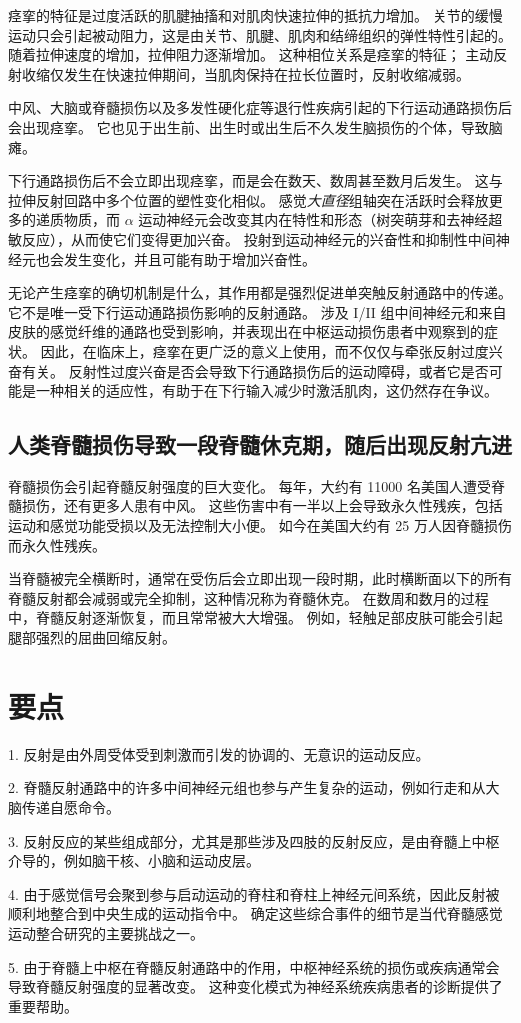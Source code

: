 痉挛的特征是过度活跃的肌腱抽搐和对肌肉快速拉伸的抵抗力增加。
关节的缓慢运动只会引起被动阻力，这是由关节、肌腱、肌肉和结缔组织的弹性特性引起的。
随着拉伸速度的增加，拉伸阻力逐渐增加。
这种相位关系是痉挛的特征；
主动反射收缩仅发生在快速拉伸期间，当肌肉保持在拉长位置时，反射收缩减弱。


中风、大脑或脊髓损伤以及多发性硬化症等退行性疾病引起的下行运动通路损伤后会出现痉挛。
它也见于出生前、出生时或出生后不久发生脑损伤的个体，导致脑瘫。


下行通路损伤后不会立即出现痉挛，而是会在数天、数周甚至数月后发生。
这与拉伸反射回路中多个位置的塑性变化相似。
感觉\textit{大直径}组轴突在活跃时会释放更多的递质物质，而 $ \alpha $ 运动神经元会改变其内在特性和形态（树突萌芽和去神经超敏反应），从而使它们变得更加兴奋。
投射到运动神经元的兴奋性和抑制性中间神经元也会发生变化，并且可能有助于增加兴奋性。


无论产生痉挛的确切机制是什么，其作用都是强烈促进单突触反射通路中的传递。
它不是唯一受下行运动通路损伤影响的反射通路。
涉及 I/II 组中间神经元和来自皮肤的感觉纤维的通路也受到影响，并表现出在中枢运动损伤患者中观察到的症状。
因此，在临床上，痉挛在更广泛的意义上使用，而不仅仅与牵张反射过度兴奋有关。
反射性过度兴奋是否会导致下行通路损伤后的运动障碍，或者它是否可能是一种相关的适应性，有助于在下行输入减少时激活肌肉，这仍然存在争议。



\subsection{人类脊髓损伤导致一段脊髓休克期，随后出现反射亢进}

脊髓损伤会引起脊髓反射强度的巨大变化。
每年，大约有 11000 名美国人遭受脊髓损伤，还有更多人患有中风。
这些伤害中有一半以上会导致永久性残疾，包括运动和感觉功能受损以及无法控制大小便。
如今在美国大约有 25 万人因脊髓损伤而永久性残疾。


当脊髓被完全横断时，通常在受伤后会立即出现一段时期，此时横断面以下的所有脊髓反射都会减弱或完全抑制，这种情况称为脊髓休克。
在数周和数月的过程中，脊髓反射逐渐恢复，而且常常被大大增强。
例如，轻触足部皮肤可能会引起腿部强烈的屈曲回缩反射。



\section{要点}

1. 反射是由外周受体受到刺激而引发的协调的、无意识的运动反应。


2. 脊髓反射通路中的许多中间神经元组也参与产生复杂的运动，例如行走和从大脑传递自愿命令。


3. 反射反应的某些组成部分，尤其是那些涉及四肢的反射反应，是由脊髓上中枢介导的，例如脑干核、小脑和运动皮层。


4. 由于感觉信号会聚到参与启动运动的脊柱和脊柱上神经元间系统，因此反射被顺利地整合到中央生成的运动指令中。
确定这些综合事件的细节是当代脊髓感觉运动整合研究的主要挑战之一。


5. 由于脊髓上中枢在脊髓反射通路中的作用，中枢神经系统的损伤或疾病通常会导致脊髓反射强度的显著改变。
这种变化模式为神经系统疾病患者的诊断提供了重要帮助。
